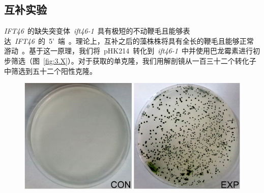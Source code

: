 \subsection{互补实验}
\textit{IFT46}\ 的缺失突变体\ \textit{ift46-1}\ 具有极短的不动鞭毛且能够表达\ \textit{IFT46}\ 的\ 5'\ 端\ \citep{Hou2007}。理论上，互补之后的藻株株将具有全长的鞭毛且能够正常
游动\ \citep{Hou2007}。基于这一原理，我们将\ pHK214\ 转化到\
\textit{ift46-1}\ 中并使用巴龙霉素进行初步筛选（图\ \ref{fig:3.X}）。对于获取的单克隆，我们用解剖镜从一百三十二个转化子中筛选到五十二个阳性克隆。
\begin{figure}[!ht]
\centering
\graphicspath{{figures/}}
\includegraphics[width=\textwidth-50mm]{fig3-X.jpg}
{
\par}
\end{figure}

